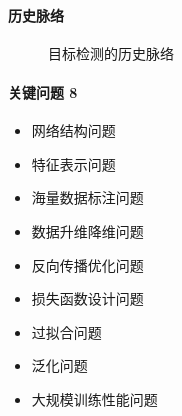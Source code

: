 \documentclass[letterpaper,11pt,english]{sphinxmanual}
\begin{document}
\paragraph{历史脉络}
\label{\detokenize{chapter_AI_dive/DL:id4}}
\begin{figure}[H]
\centering
\capstart

\noindent{}
\caption{目标检测的历史脉络\sphinxfootnotemark[851]}\label{\detokenize{chapter_AI_dive/DL:id9}}\end{figure}
%
\begin{footnotetext}[851]\sphinxAtStartFootnote
{}
%
\end{footnotetext}\ignorespaces 

\paragraph{关键问题 8\sphinxfootnotemark[852]}
\label{\detokenize{chapter_AI_dive/DL:id5}}%
\begin{footnotetext}[852]\sphinxAtStartFootnote
{}
%
\end{footnotetext}\ignorespaces \begin{itemize}
\item {} 
网络结构问题

\item {} 
特征表示问题

\item {} 
海量数据标注问题

\item {} 
数据升维降维问题

\item {} 
反向传播优化问题

\item {} 
损失函数设计问题

\item {} 
过拟合问题

\item {} 
泛化问题

\item {} 
大规模训练性能问题

\end{itemize}
\end{document}

